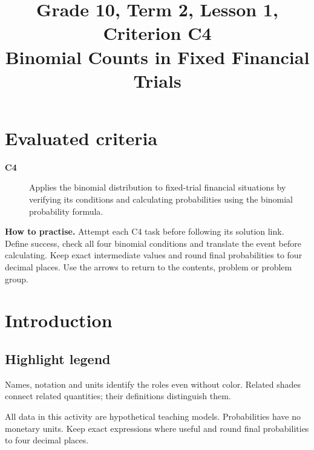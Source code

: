 \makeatletter
{}
\makeatother



\CoordinatedTermTwoPalette
\usepackage{needspace}
\setlength{\emergencystretch}{2em}
\title{Grade 10, Term 2, Lesson 1, Criterion C4\\Binomial Counts in Fixed Financial Trials}
\author{}
\date{}

\maketitle
\setcounter{tocdepth}{1}
\setcounter{secnumdepth}{2}
\label{toc}
\tableofcontents
\section*{Evaluated criteria}
\begin{description}
\item[\textbf{C4}] Applies the binomial distribution to fixed-trial financial situations by verifying its conditions and calculating probabilities using the binomial probability formula.
\end{description}
\textbf{How to practise.} Attempt each C4 task before following its solution link. Define success, check all four binomial conditions and translate the event before calculating. Keep exact intermediate values and round final probabilities to four decimal places. Use the arrows to return to the contents, problem or problem group.
\clearpage
\section{Introduction}\label{sec:t2-c4-introduction}
\subsection*{Highlight legend}
\label{tab:highlight-legend}
Names, notation and units identify the roles even without color. Related shades connect related quantities; their definitions distinguish them.

All data in this activity are hypothetical teaching models. Probabilities have no monetary units. Keep exact expressions where useful and round final probabilities to four decimal places.
